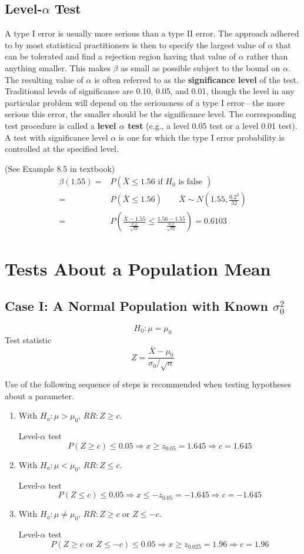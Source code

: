 \subsection{Level-$\alpha$ Test}
A type I error is usually more serious than a type II error. The approach adhered to by most statistical practitioners is then to specify the largest value of $\alpha$ that can be tolerated and find a rejection region having that value of $\alpha$ rather than anything smaller. This makes $\beta$ as small as possible subject to the bound on $\alpha$. The resulting value of $\alpha$ is often referred to as the \textbf{significance level} of the test. Traditional levels of significance are 0.10, 0.05, and 0.01, though the level in any particular problem will depend on the seriousness of a type I error—the more serious this error, the smaller should be the significance level. The corresponding test procedure is called a \textbf{level $\alpha$ test} (e.g., a level 0.05 test or a level 0.01 test). A test with significance level $\alpha$ is one for which the type I error probability is controlled at the specified level.

\begin{exmp}
(See Example 8.5 in textbook)
\begin{align*}
\beta(1.55)= & P(\bar{X}\leq 1.56 \text{ if }H_0 \text{ is false } ) \\
= & P(\bar{X} \leq 1.56) \qquad \bar{X}\sim N\left(1.55,\frac{0.2^2}{32}\right) \\
= & P\left(\frac{\bar{X}-1.55}{\frac{0.2}{\sqrt{32}}} \leq  \frac{1.56-1.55}{\frac{0.2}{\sqrt{32}}} \right)=0.6103
\end{align*}
\end{exmp}



\section{Tests About a Population Mean}
\subsection{Case I: A Normal Population with Known $\sigma_0^2$}
\[H_0:\mu=\mu_0\]
Test statistic \[Z=\frac{\bar{X}-\mu_0}{\sigma_0/\sqrt{n}}\]

Use of the following sequence of steps is recommended when testing hypotheses
about a parameter.
\begin{enumerate}
\item With $H_a: \mu>\mu_0$, $RR:Z\geq c$.

Level-$\alpha$ test
\[P(Z\geq c)\leq 0.05 \Rightarrow x \geq z_{0.05}=1.645 \Rightarrow c=1.645\]
\item With $H_a: \mu<\mu_0$, $RR:Z\leq c$.

Level-$\alpha$ test
\[P(Z\leq c)\leq 0.05 \Rightarrow x \leq -z_{0.05}=-1.645 \Rightarrow c=-1.645\]
\item With $H_a: \mu\neq\mu_0$, $RR:Z\geq c$ or $Z \leq -c$.

Level-$\alpha$ test
\[P(Z\geq c \text{ or } Z \leq -c)\leq 0.05 \Rightarrow x \geq z_{0.025}=1.96 \Rightarrow c=1.96\]
\end{enumerate}


